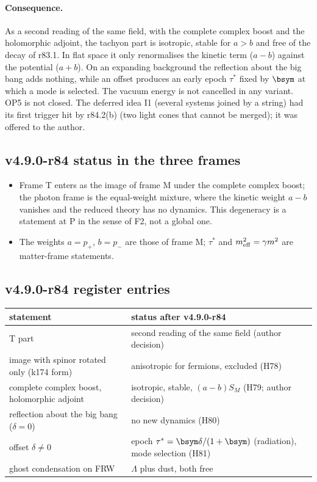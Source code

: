 \paragraph{Consequence.}
As a second reading of the same field, with the complete complex boost and the holomorphic adjoint, the tachyon part is isotropic, stable
for \(a>b\) and free of the decay of r83.1.  In flat space it only renormalises the kinetic term (\(a-b\)) against the potential (\(a+b\)).  On
an expanding background the reflection about the big bang adds nothing, while an offset produces an early epoch \(\tau^*\) fixed by \(\bsym\)
at which a mode is selected.  The vacuum energy is not cancelled in any variant.  OP5 is not closed.  The deferred idea I1 (several
systems joined by a string) had its first trigger hit by r84.2(b) (two light cones that cannot be merged); it was offered to the author.

\subsection*{v4.9.0-r84 status in the three frames}
\label{subsec:v490-r84-frames}

\begin{itemize}[leftmargin=2em]
\item Frame T enters as the image of frame M under the complete complex boost; the photon frame is the equal-weight mixture, where the
kinetic weight \(a-b\) vanishes and the reduced theory has no dynamics.  This degeneracy is a statement at P in the sense of F2, not a
global one.
\item The weights \(a=p_+\), \(b=p_-\) are those of frame M; \(\tau^*\) and \(m_{\rm eff}^2=\gamma m^2\) are matter-frame statements.
\end{itemize}

\subsection*{v4.9.0-r84 register entries}
\label{subsec:v490-r84-register}

\begin{center}
\small
\begin{tabular}{@{}>{\raggedright\arraybackslash}p{}>{\raggedright\arraybackslash}p{}@{}}
\toprule
statement & status after v4.9.0-r84\\
\midrule
T part & second reading of the same field (author decision)\\
image with spinor rotated only (k174 form) & anisotropic for fermions, excluded (H78)\\
complete complex boost, holomorphic adjoint & isotropic, stable, \((a-b)S_M\) (H79; author decision)\\
reflection about the big bang (\(\delta=0\)) & no new dynamics (H80)\\
offset \(\delta\neq0\) & epoch \(\tau^*=\bsym\delta/(1+\bsym)\) (radiation), mode selection (H81)\\
ghost condensation on FRW & \(\Lambda\) plus dust, both free\\
\bottomrule
\end{tabular}
\end{center}

